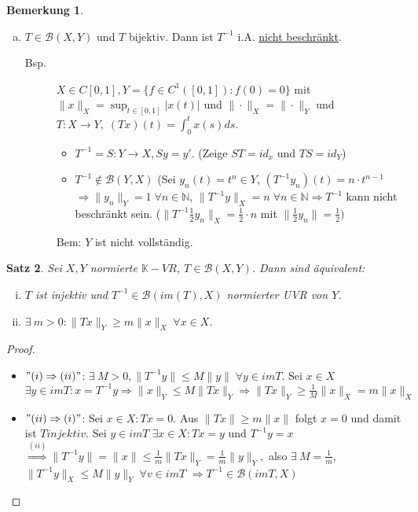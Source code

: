 \documentclass[ngerman]{report}
\theoremstyle{plain}%
\newtheorem{thm}{Satz}[chapter]
\theoremstyle{definition}%
\theoremstyle{myStyle}
\newtheorem{bem}[thm]{Bemerkung}
\newcommand{\N}{\mathbb{N}}
\newcommand{\K}{\mathbb{K}}
\newcommand{\B}{\mathcal{B}} %
\newcommand{\BS}[1][X,Y]{\mathcal{B}(#1)} %
\newcommand{\norm}[1]{\|#1\|}
\newcommand{\df}[1][]{%
	\overset{#1}{\Rightarrow}
}
\newcommand{\inv}[1]{#1^{-1}}
\newcommand{\disp}{\displaystyle}
\begin{document}
\begin{bem}
\begin{enumerate}[a)]
		\item $T\in \BS$ und $T$ bijektiv. Dann ist $\inv{T}$ i.A. \underline{nicht beschränkt}.
			\begin{description} 
				\item[Bsp.]	$X\in C[0,1], Y= \{f\in C^1([0,1]): f(0) = 0\}$ mit $\disp \norm{x}_X = \sup_{t\in[0,1]}|x(t)|$ und $\norm{\cdot}_X = \norm{\cdot}_Y$ und $T: X\to Y,\; (Tx)(t) = \int_0^t x(s)ds$.
				\begin{itemize}
					\item $\inv{T}=S: Y\to X, Sy = y'$. (Zeige $ST = id_x$ und $TS = id_Y$)
					\item $\inv{T}\not\in\B(Y,X)$ (Sei $y_n(t) = t^n\in Y$, $(\inv{T}y_n)(t) = n\cdot t^{n-1}$
					$\df \norm{y_n}_Y =1 \; \forall n\in \N$, $\norm{\inv{T}y}_X =n \; \forall n\in\N \df \inv{T}$ kann nicht beschränkt sein. 
					($\norm{\inv{T}\frac{1}{2} y_n}_X = \frac{1}{2} \cdot n$ mit $\norm{\frac{1}{2} y_n} = \frac{1}{2})$
				\end{itemize}
				Bem: $Y$ ist nicht vollständig.
			\end{description}
		\end{enumerate}
	\end{bem}

	\begin{thm}
		Sei $X,Y$ normierte $\K-VR$, $T\in \BS$. Dann sind äquivalent:
			\begin{enumerate}[(i)]
				\item $T$ ist injektiv und $\inv{T} \in\B(im(T), X)$ normierter UVR von $Y$.
				\item $\exists \: m > 0: \norm{Tx}_Y \geq m\norm{x}_X \; \forall x\in X$.
			\end{enumerate}
	\end{thm}
	\begin{proof}
		\begin{itemize}[]
			\item $"(i)\df (ii)"$: $\exists \: M>0, \norm{\inv{T}y} \leq M\norm{y} \; \forall y\in imT.$
				Sei $x\in X$ $\exists y\in imT: x = \inv{T}y \df \norm{x}_Y \leq M \norm{Tx}_Y 
				\df \norm{Tx}_Y \geq \frac{1}{M} \norm{x}_X = m\norm{x}_X$
			\item $"(ii) \df (i)"$: Sei $x\in X: Tx = 0$.
				Aus $\norm{Tx} \geq m \norm{x}$ folgt $x = 0$ und damit ist $T injektiv$.
				Sei $y\in imT \; \exists x\in X: Tx = y$ und $\inv{T}y = x $
				$\df[(ii)] \norm{\inv{T}y} = \norm{x} \leq \frac{1}{m} \norm{Tx}_Y = \frac{1}{m} \norm{y}_Y,$
				also $\exists\: M = \frac{1}{m}$, $\norm{\inv{T}y}_X \leq M\norm{y}_Y \; \forall v\in imT$
				$\df \inv{T} \in \B(imT,X)$
		\end{itemize}
	\end{proof}
\end{document}
